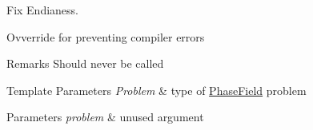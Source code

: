 Fix Endianess. 

Ovverride for preventing compiler errors \begin{DoxyRemark}{Remarks}
Should never be called
\end{DoxyRemark}

\begin{DoxyTemplParams}{Template Parameters}
{\em Problem} & type of \hyperlink{namespaceUintah_1_1PhaseField}{Phase\+Field} problem \\
\hline
\end{DoxyTemplParams}

\begin{DoxyParams}{Parameters}
{\em problem} & unused argument \\
\hline
\end{DoxyParams}
